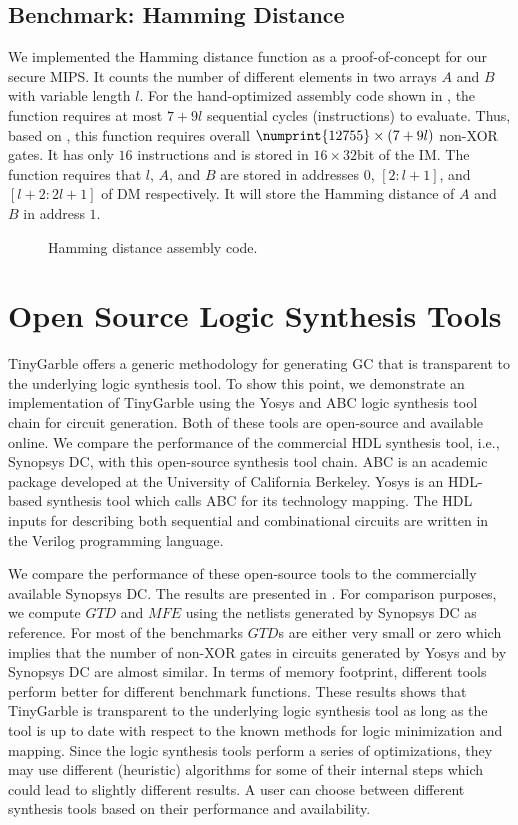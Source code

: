 \subsection{Benchmark: Hamming Distance}
We implemented the Hamming distance function as a proof-of-concept for our secure MIPS.
It counts the number of different elements in two arrays $A$ and $B$ with variable length $l$.
For the hand-optimized assembly code shown in , the function requires at most $7+9l$ sequential cycles (instructions) to evaluate.
Thus, based on , this function requires overall $\numprint{12755}\times(7+9l)$ non-XOR gates.
It has only $16$ instructions and is stored in $16\times32$bit of the IM.
The function requires that $l$, $A$, and $B$ are stored in addresses $0$, $[2:l+1]$, and $[l+2:2l+1]$ of DM respectively.
It will store the Hamming distance of $A$ and $B$ in address $1$.

\begin{figure}

\caption{Hamming distance assembly code.}\label{figure:hamminassembly}
\end{figure}

\section{Open Source Logic Synthesis Tools}
TinyGarble offers a generic methodology for generating GC that is transparent to the underlying logic synthesis tool.
To show this point, we demonstrate an implementation of TinyGarble using the Yosys \cite{tool:Yosys} and ABC \cite{tool:ABC} logic synthesis tool chain for circuit generation.
Both of these tools are open-source and available online.
We compare the performance of the commercial HDL synthesis tool, i.e., Synopsys DC, with this open-source synthesis tool chain.
ABC is an academic package developed at the University of California Berkeley.
Yosys is an HDL-based synthesis tool which calls ABC for its technology mapping.
The HDL inputs for describing both sequential and combinational circuits are written in the Verilog programming language.

We compare the performance of these open-source tools to the commercially available Synopsys DC.
The results are presented in .
For comparison purposes, we compute $\mathit{GTD}$ and $\mathit{MFE}$ using the netlists generated by Synopsys DC as reference.
For most of the benchmarks $\mathit{GTD}$s are either very small or zero which implies that the number of non-XOR gates in circuits generated by Yosys and by Synopsys DC are almost similar.
In terms of memory footprint, different tools perform better for different benchmark functions.
These results shows that TinyGarble is transparent to the underlying logic synthesis tool as long as the tool is up to date with respect to the known methods for logic minimization and mapping.
Since the logic synthesis tools perform a series of optimizations, they may use different (heuristic) algorithms for some of their internal steps which could lead to slightly different results.
A user can choose between different synthesis tools based on their performance and availability.

